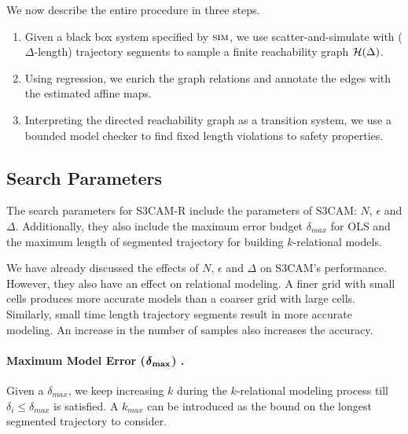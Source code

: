 
We now describe the entire procedure in three steps.
\begin{enumerate}
    \item Given a black box system specified by $\mbox{\sc sim}$, we
        use scatter-and-simulate with ($\Delta$-length) trajectory
        segments to sample a finite reachability graph
        $\mathcal{H}(\Delta)$.
    \item Using regression, we enrich the graph relations and annotate
        the edges with the estimated affine maps.
    \item Interpreting the directed reachability graph as a transition
        system, we use a bounded model checker to find fixed length
        violations to safety properties.
\end{enumerate}


\subsection{Search Parameters}

The search parameters for S3CAM-R include the parameters of S3CAM:
$N$, $\epsilon$ and $\Delta$. Additionally, they also include the
maximum error budget $\delta_{max}$ for OLS and the maximum length of
segmented trajectory for building $k$-relational models.

We have already discussed the effects of $N$, $\epsilon$ and $\Delta$
on S3CAM's performance. However, they also have an effect on
relational modeling. A finer grid with small cells produces more
accurate models than a coarser grid with large cells. Similarly,
small time length trajectory segments result in more accurate
modeling. An increase in the number of samples also increases the
accuracy.

\paragraph{Maximum Model Error ($\boldsymbol{\delta}_{\bold{max}}$) .}
Given a $\delta_{max}$, we keep increasing $k$ during the
$k$-relational modeling process till $\delta_i \le \delta_{max}$ is
satisfied. A $k_{max}$ can be introduced as the bound on the longest
segmented trajectory to consider.



